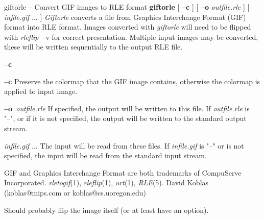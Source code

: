 giftorle -- Convert GIF images to RLE format
{\bf giftorle}
[
{\bf --c}
]
[
{\bf --o}
{\it outfile.rle}
]
[
{\it infile.gif} ...
]
{\it Giftorle}
converts a file from Graphics Interchange Format (GIF) format into RLE format.
Images converted with 
{\it giftorle}
will need to be flipped with
{\it rleflip}{\rm \ --v}
for correct presentation.  Multiple input images may be converted,
these will be written sequentially to the output RLE file.
\begin{TPlist}{{\bf --c}}
\item[{{\bf --c}}]
Preserve the colormap that the GIF image contains, otherwise the
colormap is applied to input image.
\item[{{\bf --o}{\it \ outfile.rle}
}]
If specified, the output will be written to this file.  If 
{\it outfile.rle}
is "--", or if it is not specified, the output will be written to the
standard output stream.
\item[{{\it infile.gif} ...}]
The input will be read from these files.  If
{\it infile.gif}
is "--" or is not specified, the input will be read from the standard
input stream.
\end{TPlist}
GIF and Graphics Interchange Format are both trademarks of CompuServe
Incorporated.
{\it rletogif}{\rm (1),}
{\it rleflip}{\rm (1),}
{\it urt}{\rm (1),}
{\it RLE}{\rm (5).}
David Koblas (koblas@mips.com or koblas@cs.uoregon.edu)

Should probably flip the image itself (or at least have an option).
\newpage


